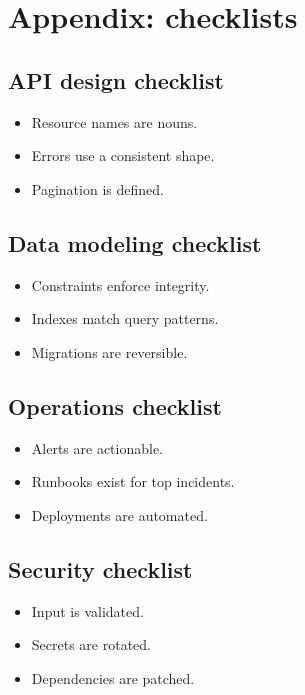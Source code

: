 \chapter{Appendix: checklists}

\section{API design checklist}
\begin{itemize}[nosep]
  \item Resource names are nouns.
  \item Errors use a consistent shape.
  \item Pagination is defined.
\end{itemize}

\section{Data modeling checklist}
\begin{itemize}[nosep]
  \item Constraints enforce integrity.
  \item Indexes match query patterns.
  \item Migrations are reversible.
\end{itemize}

\section{Operations checklist}
\begin{itemize}[nosep]
  \item Alerts are actionable.
  \item Runbooks exist for top incidents.
  \item Deployments are automated.
\end{itemize}

\section{Security checklist}
\begin{itemize}[nosep]
  \item Input is validated.
  \item Secrets are rotated.
  \item Dependencies are patched.
\end{itemize}
